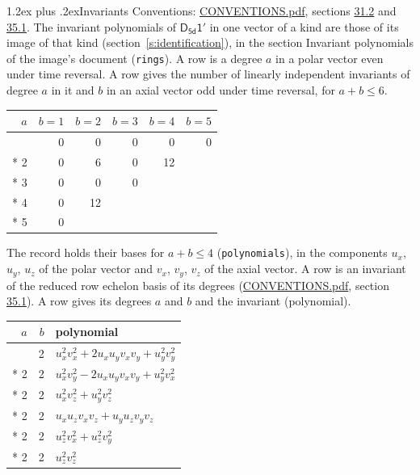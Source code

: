 \documentclass[10pt,a4paper]{article}
\makeatletter
\renewcommand\section{\@startsection{section}{1}{\z@}{-3ex plus -1ex minus -.2ex}%
  {1.2ex plus .2ex}{\normalfont\large\sffamily\bfseries\color{parttitle}}}
\numberwithin{equation}{section}
\newcommand{\grp}[1]{\mathsf{#1}}
\makeatother
\begin{document}
\section{Invariants}\label{s:invariants}
Conventions: \href{../../CONVENTIONS.pdf}{CONVENTIONS.pdf}, sections \href{../../CONVENTIONS.pdf\#conv.31.2}{31.2} and \href{../../CONVENTIONS.pdf\#conv.35.1}{35.1}.
The invariant polynomials of $\grp{D_{5d}1'}$ in one vector of a kind are those of its image of that kind (section~\ref{s:identification}), in the section Invariant polynomials of the image's document (\texttt{rings}).
\leavevmode\label{n:index.degree.polar}\label{n:index.degree.axial}A row is a degree $a$ in a polar vector even under time reversal. A row gives the number of linearly independent invariants of degree $a$ in it and $b$ in an axial vector odd under time reversal, for $a + b \le 6$.
{\small\begin{longtable}{@{}rrrrrr@{}}\toprule
$a$ & $b = 1$ & $b = 2$ & $b = 3$ & $b = 4$ & $b = 5$\\\midrule\endhead
\bottomrule\endfoot\endlastfoot
1 & 0 & 0 & 0 & 0 & 0\\*
2 & 0 & 6 & 0 & 12 & \\*
3 & 0 & 0 & 0 &  & \\*
4 & 0 & 12 &  &  & \\*
5 & 0 &  &  &  & \\
\bottomrule\end{longtable}}
\leavevmode\label{n:local.component.polar}\label{n:local.component.axial}The record holds their bases for $a + b \le 4$ (\texttt{polynomials}), in the components $u_{x}$, $u_{y}$, $u_{z}$ of the polar vector and $v_{x}$, $v_{y}$, $v_{z}$ of the axial vector. \label{n:head.polynomial}A row is an invariant of the reduced row echelon basis of its degrees (\href{../../CONVENTIONS.pdf}{CONVENTIONS.pdf}, section \href{../../CONVENTIONS.pdf\#conv.35.1}{35.1}). A row gives its degrees $a$ and $b$ and the invariant (polynomial).
{\small\renewcommand{\arraystretch}{1.2}\begin{longtable}{@{}rrl@{}}\toprule
$a$ & $b$ & polynomial\\\midrule\endhead
\bottomrule\endfoot\endlastfoot
2 & 2 & $u_{x}^{2}v_{x}^{2} + 2u_{x}u_{y}v_{x}v_{y} + u_{y}^{2}v_{y}^{2}$\\*
2 & 2 & $u_{x}^{2}v_{y}^{2} - 2u_{x}u_{y}v_{x}v_{y} + u_{y}^{2}v_{x}^{2}$\\*
2 & 2 & $u_{x}^{2}v_{z}^{2} + u_{y}^{2}v_{z}^{2}$\\*
2 & 2 & $u_{x}u_{z}v_{x}v_{z} + u_{y}u_{z}v_{y}v_{z}$\\*
2 & 2 & $u_{z}^{2}v_{x}^{2} + u_{z}^{2}v_{y}^{2}$\\*
2 & 2 & $u_{z}^{2}v_{z}^{2}$\\
\bottomrule\end{longtable}}
\end{document}
